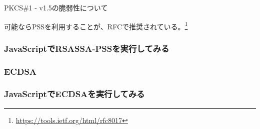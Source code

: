 \documentclass[12pt,dvipdfmx]{beamer}
\begin{document}
\begin{frame}
\alert{PKCS\#1 - v1.5の脆弱性について}


可能ならPSSを利用することが、RFCで推奨されている。\footnote[frame]{\scriptsize \url{https://tools.ietf.org/html/rfc8017}}
\end{frame}

\begin{frame}
\frametitle{JavaScriptでRSASSA-PSSを実行してみる}
\end{frame}

\begin{frame}
\frametitle{ECDSA}
\end{frame}

\begin{frame}
\frametitle{JavaScriptでECDSAを実行してみる}
\end{frame}
\end{document}
